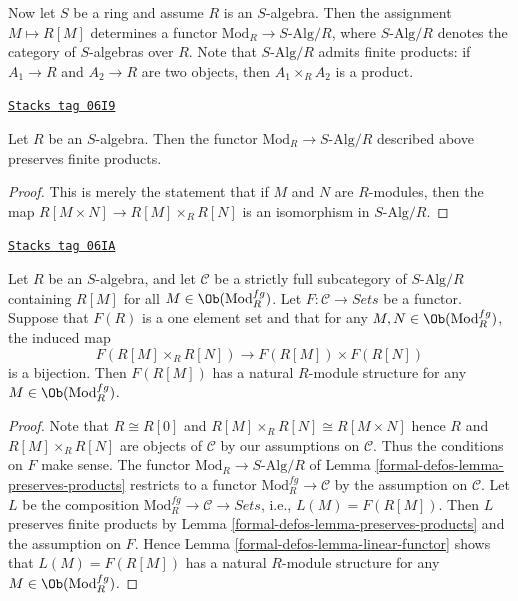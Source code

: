 \medskip\noindent
Now let $S$ be a ring and assume $R$ is an $S$-algebra.
Then the assignment $M \mapsto R[M]$ determines a functor
$\text{Mod}_R \to S\text{-Alg}/R$, where $S\text{-Alg}/R$
denotes the category of $S$-algebras over $R$. Note that
$S\text{-Alg}/R$ admits finite products: if $A_1 \to R$ and
$A_2 \to R$ are two objects, then $A_1 \times_R A_2$ is a product.

\begin{lemma}
\label{formal-defos-lemma-preserves-products}
\href{https://stacks.math.columbia.edu/tag/06I9}{\texttt{Stacks tag 06I9}}

Let $R$ be an $S$-algebra. Then the functor
$\text{Mod}_R \to S\text{-Alg}/R$ described above preserves finite products.
\end{lemma}

\begin{proof}
This is merely the statement that if $M$ and $N$ are $R$-modules, then the map
$R[M \times N] \to R[M] \times_R R[N]$ is an isomorphism in
$S\text{-Alg}/R$.
\end{proof}

\begin{lemma}
\label{formal-defos-lemma-tangent-space-functor}
\href{https://stacks.math.columbia.edu/tag/06IA}{\texttt{Stacks tag 06IA}}

Let $R$ be an $S$-algebra, and let $\mathcal{C}$ be a strictly full
subcategory of $S\text{-Alg}/R$ containing $R[M]$ for all
$M \in \Ob(\text{Mod}^{fg}_R)$.
Let $F: \mathcal{C} \to \textit{Sets}$ be a functor. Suppose that
$F(R)$ is a one element set and that for any $M, N \in
\Ob(\text{Mod}^{fg}_R)$, the induced map
$$
F(R[M] \times_R R[N]) \to F(R[M]) \times F(R[N])
$$
is a bijection. Then $F(R[M])$ has a natural $R$-module structure for any $M
\in \Ob(\text{Mod}^{fg}_R)$.
\end{lemma}

\begin{proof}
Note that $R \cong R[0]$ and $R[M] \times_R R[N] \cong R[M \times N]$ hence
$R$ and $R[M] \times_R R[N]$ are objects of $\mathcal{C}$ by our assumptions on
$\mathcal{C}$. Thus the conditions on $F$ make sense.
The functor $\text{Mod}_R \to S\text{-Alg}/R$ of
Lemma \ref{formal-defos-lemma-preserves-products}
restricts to a functor $\text{Mod}^{fg}_R \to \mathcal{C}$
by the assumption on $\mathcal{C}$. Let $L$ be the composition
$\text{Mod}^{fg}_R \to \mathcal{C} \to \textit{Sets}$, i.e.,
$L(M) = F(R[M])$.
Then $L$ preserves finite products by
Lemma \ref{formal-defos-lemma-preserves-products}
and the assumption on $F$. Hence
Lemma \ref{formal-defos-lemma-linear-functor}
shows that $L(M) = F(R[M])$ has a natural $R$-module structure for any
$M \in \Ob(\text{Mod}^{fg}_R)$.
\end{proof}

